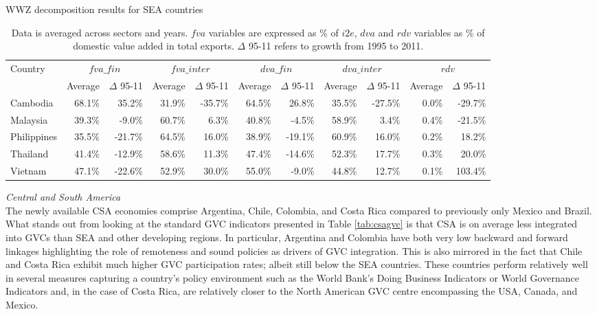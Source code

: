 \documentclass[11pt,a4paper]{article}
\begin{document}
\begin{table}[!h]\small
  \centering
  \caption{WWZ decomposition results for SEA countries}
  \hspace*{-2.7cm}
    \begin{tabular}{lrrrrrrrrrr} 
    \toprule
    \multicolumn{1}{l}{\multirow{1}[0]{*}{Country}} & \multicolumn{2}{c}{$fva\_fin$} & \multicolumn{2}{c}{$fva\_inter$} & \multicolumn{2}{c}{$dva\_fin$} & \multicolumn{2}{c}{$dva\_inter$} & \multicolumn{2}{c}{$rdv$} \\
    \multicolumn{1}{l}{} & \multicolumn{1}{c}{Average} & \multicolumn{1}{c}{$\Delta$ 95-11} &
\multicolumn{1}{c}{Average} & \multicolumn{1}{c}{$\Delta$ 95-11} & \multicolumn{1}{c}{Average} & \multicolumn{1}{c}{$\Delta$ 95-11} & \multicolumn{1}{c}{Average} & \multicolumn{1}{c}{$\Delta$ 95-11} & \multicolumn{1}{c}{Average} & \multicolumn{1}{c}{$\Delta$ 95-11} \\
  \midrule
    Cambodia & 68.1\% & 35.2\% & 31.9\% & -35.7\% & 64.5\% & 26.8\% & 35.5\% & -27.5\% & 0.0\% & -29.7\% \\
    Malaysia & 39.3\% & -9.0\% & 60.7\% & 6.3\% & 40.8\% & -4.5\% & 58.9\% & 3.4\% & 0.4\% & -21.5\% \\
    Philippines & 35.5\% & -21.7\% & 64.5\% & 16.0\% & 38.9\% & -19.1\% & 60.9\% & 16.0\% & 0.2\% & 18.2\% \\
    Thailand & 41.4\% & -12.9\% & 58.6\% & 11.3\% & 47.4\% & -14.6\% & 52.3\% & 17.7\% & 0.3\% & 20.0\% \\
    Vietnam & 47.1\% & -22.6\% & 52.9\% & 30.0\% & 55.0\% & -9.0\% & 44.8\% & 12.7\% & 0.1\% & 103.4\% \\
    \bottomrule
    \end{tabular}
  \label{tab:seawwz}
   \caption*{Data is averaged across sectors and years. $fva$ variables are expressed as \% of $i2e$, $dva$ and $rdv$ variables as \% of domestic value added in total exports. $\Delta$ 95-11 refers to growth from 1995 to 2011.}
\end{table}


\textit{Central and South America}\\
The newly available CSA economies comprise Argentina, Chile, Colombia, and Costa Rica compared to previously only Mexico and Brazil. What stands out from looking at the standard GVC indicators presented in Table \ref{tab:csagvc} is that CSA is on average less integrated into GVCs than SEA and other developing regions. In particular, Argentina and Colombia have both very low backward and forward linkages highlighting the role of remoteness and sound policies as drivers of GVC integration. This is also mirrored in the fact that Chile and Costa Rica exhibit much higher GVC participation rates; albeit still below the SEA countries. These countries perform relatively well in several measures capturing a country's policy environment such as the World Bank's Doing Business Indicators or World Governance Indicators and, in the case of Costa Rica, are relatively closer to the North American GVC centre encompassing the USA, Canada, and Mexico. 
\end{document}

